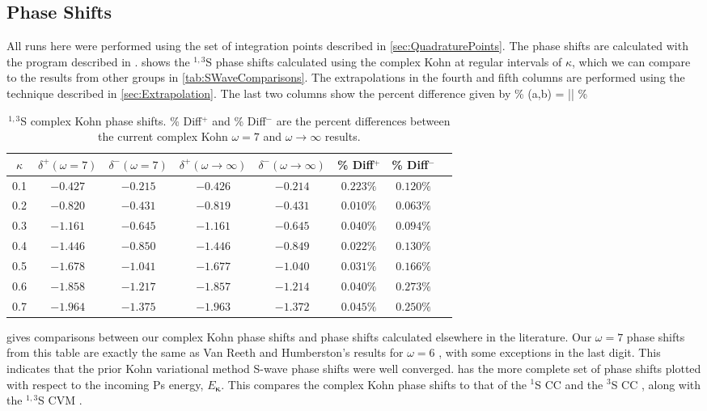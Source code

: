 \documentclass[Dissertation.tex]{subfiles}
\begin{document}
\subsection{Phase Shifts}
All runs here were performed using the set of integration points described in \cref{sec:QuadraturePoints}. The phase shifts are calculated with the program described in \cite{}.  shows the $^{1,3}$S phase shifts calculated using the complex Kohn at regular intervals of $\kappa$, which we can compare to the results from other groups in \cref{tab:SWaveComparisons}. The extrapolations in the fourth and fifth columns are performed using the technique described in \cref{sec:Extrapolation}. The last two columns show the percent difference given by
\beq
\% (a,b) = \left|\right| \%
\eeq

\begin{table}[H]
\centering
\begin{tabular}{c c c c c c c c}
\toprule
$\kappa$ & $\delta^+ (\omega = 7)$ & $\delta^- (\omega = 7)$ & $\delta^+ (\omega \rightarrow \infty)$ & $\delta^- (\omega \rightarrow \infty)$ & \% Diff$^+$ & \% Diff$^-$ \\
\midrule
0.1 & $-0.427$ & $-0.215$ & $-0.426$ & $-0.214$ & $0.223\%$ & $0.120\%$ \\
0.2 & $-0.820$ & $-0.431$ & $-0.819$ & $-0.431$ & $0.010\%$ & $0.063\%$ \\
0.3 & $-1.161$ & $-0.645$ & $-1.161$ & $-0.645$ & $0.040\%$ & $0.094\%$ \\
0.4 & $-1.446$ & $-0.850$ & $-1.446$ & $-0.849$ & $0.022\%$ & $0.130\%$ \\
0.5 & $-1.678$ & $-1.041$ & $-1.677$ & $-1.040$ & $0.031\%$ & $0.166\%$ \\
0.6 & $-1.858$ & $-1.217$ & $-1.857$ & $-1.214$ & $0.040\%$ & $0.273\%$ \\
0.7 & $-1.964$ & $-1.375$ & $-1.963$ & $-1.372$ & $0.045\%$ & $0.250\%$ \\
\bottomrule
\end{tabular}
\caption[$^{1,3}$S complex Kohn phase shifts]{$^{1,3}$S complex Kohn phase shifts. \% Diff$^+$ and \% Diff$^-$ are the percent differences between the
 current complex Kohn $\omega = 7$ and $\omega \rightarrow \infty$ results.}
\label{tab:SWavePhase}
\end{table}

 gives comparisons between our complex Kohn phase shifts and phase shifts calculated elsewhere in the literature. Our $\omega = 7$ phase shifts from this table are exactly the same as Van Reeth and Humberston's results for $\omega = 6$ \cite{VanReeth2003}, with some exceptions in the last digit. This indicates that the prior Kohn variational method S-wave phase shifts were well converged. 
 has the more complete set of phase shifts plotted with respect to the incoming Ps energy, $E_{\bm \kappa}$. This compares the complex Kohn phase shifts to that of the $^1$S CC \cite{Walters2004} and the $^3$S CC \cite{Blackwood2002}, along with the $^{1,3}$S CVM \cite{Zhang2012}. 
\end{document}
